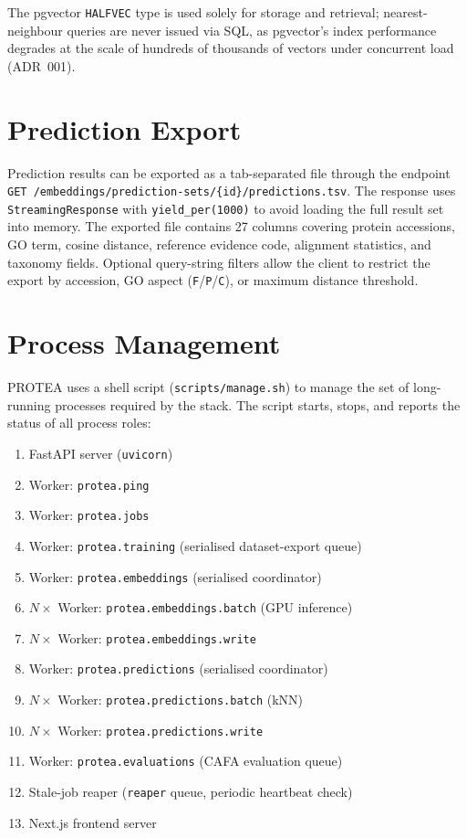 The pgvector \texttt{HALFVEC} type is used solely for storage and retrieval;
nearest-neighbour queries are never issued via SQL, as pgvector's index
performance degrades at the scale of hundreds of thousands of vectors under
concurrent load (ADR~001).

\section{Prediction Export}
\label{sec:export}

Prediction results can be exported as a tab-separated file through the endpoint
\texttt{GET /embeddings/prediction-sets/\{id\}/predictions.tsv}. The response
uses \texttt{StreamingResponse} with \texttt{yield\_per(1000)} to avoid loading
the full result set into memory. The exported file contains 27 columns covering
protein accessions, GO term, cosine distance, reference evidence code, alignment
statistics, and taxonomy fields. Optional query-string filters allow the client
to restrict the export by accession, GO aspect (\texttt{F}/\texttt{P}/\texttt{C}),
or maximum distance threshold.

\section{Process Management}
\label{sec:process-management}

PROTEA uses a shell script (\texttt{scripts/manage.sh}) to manage the set of
long-running processes required by the stack. The script starts, stops, and
reports the status of all process roles:

\begingroup\sloppy
\begin{enumerate}
  \item FastAPI server (\texttt{uvicorn})
  \item Worker: \texttt{protea.ping}
  \item Worker: \texttt{protea.jobs}
  \item Worker: \texttt{protea.training} (serialised dataset-export queue)
  \item Worker: \texttt{protea.embeddings} (serialised coordinator)
  \item $N \times$ Worker: \texttt{protea.embeddings.batch} (GPU inference)
  \item $N \times$ Worker: \texttt{protea.embeddings.write}
  \item Worker: \texttt{protea.predictions} (serialised coordinator)
  \item $N \times$ Worker: \texttt{protea.predictions.batch} (kNN)
  \item $N \times$ Worker: \texttt{protea.predictions.write}
  \item Worker: \texttt{protea.evaluations} (CAFA evaluation queue)
  \item Stale-job reaper (\texttt{reaper} queue, periodic heartbeat check)
  \item Next.js frontend server
\end{enumerate}
\endgroup

